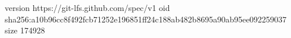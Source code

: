 version https://git-lfs.github.com/spec/v1
oid sha256:a10b96cc8f492fcb71252e196851ff24c188ab482b8695a90ab95ee092259037
size 174928
